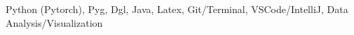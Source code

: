 Python (Pytorch), Pyg, Dgl, Java, Latex, Git/Terminal, VSCode/IntelliJ, Data Analysis/Visualization

